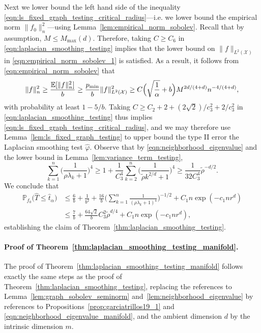 \documentclass[twoside]{article}
\newcommand{\1}{\mathbf{1}}
\newcommand{\Xset}{\mathcal{X}}
\newcommand{\Leb}{L}
\newcommand{\mc}[1]{\mathcal{#1}}
\newcommand{\Pbb}{\mathbb{P}}
\newcommand{\wt}[1]{\widetilde{#1}}
\newcommand{\wh}[1]{\widehat{#1}}
\theoremstyle{definition}
\theoremstyle{remark}
\begin{document}
Next we lower bound the left hand side of the inequality \eqref{eqn:ls_fixed_graph_testing_critical_radius}---i.e. we lower bound the empirical norm $\|f_0\|_n^2$---using Lemma~\ref{lem:empirical_norm_sobolev}. Recall that by assumption, $M \leq M_{\max}(d)$. Therefore, taking $C \geq C_6$ in \eqref{eqn:laplacian_smoothing_testing} implies that the lower bound on $\|f\|_{\Leb^2(\mc{X})}$ in \eqref{eqn:empirical_norm_sobolev_1} is satisfied. As a result, it follows from \eqref{eqn:empirical_norm_sobolev} that
\begin{equation*}
\|f\|_n^2 \geq \frac{\mathbb{E}[\|f\|_n^2]}{b} \geq \frac{p_{\min}}{b} \|f\|_{\Leb^2(\Xset)}^2 \geq C\Bigl(\sqrt{\frac{1}{\alpha}} + b\Bigr)M^{2d/(4 + d)}n^{-4/(4 + d)},
\end{equation*}
with probability at least $1 - 5/b$. Taking $C \geq C_2 + 2 + (2\sqrt{2})/c_3^{2} + 2/c_3^2$ in \eqref{eqn:laplacian_smoothing_testing} thus implies \eqref{eqn:ls_fixed_graph_testing_critical_radius}, and we may therefore use Lemma~\ref{lem:ls_fixed_graph_testing} to upper bound the type II error the Laplacian smoothing test $\wh{\varphi}$. Observe that by \eqref{eqn:neighborhood_eigenvalue} and the lower bound in Lemma~\ref{lem:variance_term_testing}, 
\begin{equation*}
\sum_{k = 1}^{n} \biggl(\frac{1}{\rho \lambda_k + 1}\biggr)^4 \geq 1 + \frac{1}{C_3^4}\sum_{k = 2}^{n}\biggl(\frac{1}{\wt{\rho}k^{2/d} + 1}\biggr)^4 \geq \frac{1}{32C_3^4}\wt{\rho}^{-d/2}.
\end{equation*}
We conclude that
\begin{align*}
\Pbb_{f_0}\bigl(\wh{T} \leq \wh{t}_{\alpha}\bigr) & \leq \frac{6}{b} + \frac{1}{b^2} + \frac{16}{b} \Biggl(\sum_{k = 1}^{n} \frac{1}{(\rho\lambda_k + 1)^4} \Biggr)^{-1/2} + C_1n\exp(-c_1nr^d)\\
& \leq \frac{7}{b} + \frac{64\sqrt{2}}{b} C_3^{2}\wt{\rho}^{d/4} + C_1n\exp(-c_1nr^d),
\end{align*}
establishing the claim of Theorem~\ref{thm:laplacian_smoothing_testing}.

\paragraph{Proof of Theorem~\ref{thm:laplacian_smoothing_testing_manifold}.}
The proof of Theorem~\ref{thm:laplacian_smoothing_testing_manifold} follows exactly the same steps as the proof of Theorem~\ref{thm:laplacian_smoothing_testing}, replacing the references to Lemma~\ref{lem:graph_sobolev_seminorm} and~\ref{lem:neighborhood_eigenvalue} by references to Propositions~\ref{prop:garciatrillos19_1} and \eqref{eqn:neighborhood_eigenvalue_manifold}, and the ambient dimension $d$ by the intrinsic dimension $m$.
\end{document}
